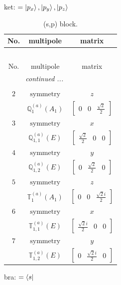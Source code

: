 \documentclass[fleqn,8pt,landscape]{jsarticle}
\begin{document}
\noindent
ket: $=\ket{p_{x}}, \ket{p_{y}}, \ket{p_{z}}$
\renewcommand{\arraystretch}{1.6}
\begin{longtable}{ccc}
\caption{(s,p) block.}
 \\
 \hline \hline
No. & multipole & matrix \\ \hline \endfirsthead

\multicolumn{2}{l}{\tablename\ \thetable{}} \\
 \hline \hline
No. & multipole & matrix \\ \hline \endhead

 \hline \hline
\multicolumn{2}{r}{\footnotesize\it continued ...} \\ \endfoot

 \hline \hline
\multicolumn{2}{r}{} \\ \endlastfoot

$ 2 $ & $ \text{symmetry} $ & $ z $ \\
$  $ & $ \mathbb{Q}_{1}^{(a)}(A_{1}) $ & $ \begin{bmatrix} 0 & 0 & \frac{\sqrt{2}}{2} \end{bmatrix} $ \\ \hline
$ 3 $ & $ \text{symmetry} $ & $ x $ \\
$  $ & $ \mathbb{Q}_{1,1}^{(a)}(E) $ & $ \begin{bmatrix} \frac{\sqrt{2}}{2} & 0 & 0 \end{bmatrix} $ \\ \hline
$ 4 $ & $ \text{symmetry} $ & $ y $ \\
$  $ & $ \mathbb{Q}_{1,2}^{(a)}(E) $ & $ \begin{bmatrix} 0 & \frac{\sqrt{2}}{2} & 0 \end{bmatrix} $ \\ \hline
$ 5 $ & $ \text{symmetry} $ & $ z $ \\
$  $ & $ \mathbb{T}_{1}^{(a)}(A_{1}) $ & $ \begin{bmatrix} 0 & 0 & \frac{\sqrt{2} i}{2} \end{bmatrix} $ \\ \hline
$ 6 $ & $ \text{symmetry} $ & $ x $ \\
$  $ & $ \mathbb{T}_{1,1}^{(a)}(E) $ & $ \begin{bmatrix} \frac{\sqrt{2} i}{2} & 0 & 0 \end{bmatrix} $ \\ \hline
$ 7 $ & $ \text{symmetry} $ & $ y $ \\
$  $ & $ \mathbb{T}_{1,2}^{(a)}(E) $ & $ \begin{bmatrix} 0 & \frac{\sqrt{2} i}{2} & 0 \end{bmatrix} $ \\ \hline
\end{longtable}
bra: $=\bra{s}$
\end{document}
